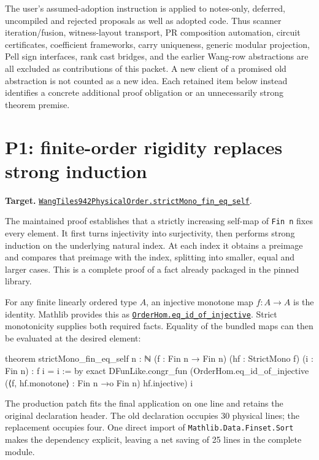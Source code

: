 \documentclass[11pt]{article}
\newcommand{\code}[1]{\nolinkurl{#1}}
\newcommand{\repo}[2]{\href{https://github.com/VladimirReshetnikov/ProveIt/blob/7df43cdfacb490cd3ca3acd23e39027efebf8801/Computability/DiophantineConsistency/#1}{#2}}
\newcommand{\ml}[2]{\href{https://github.com/leanprover-community/mathlib4/blob/81a5d257c8e410db227a6665ed08f64fea08e997/Mathlib/#1}{#2}}
\begin{document}
The user's assumed-adoption instruction is applied to notes-only, deferred, uncompiled and rejected proposals as well as adopted code. Thus scanner iteration/fusion, witness-layout transport, PR composition automation, circuit certificates, coefficient frameworks, carry uniqueness, generic modular projection, Pell sign interfaces, rank cast bridges, and the earlier Wang-row abstractions are all excluded as contributions of this packet. A new client of a promised old abstraction is not counted as a new idea. Each retained item below instead identifies a concrete additional proof obligation or an unnecessarily strong theorem premise.

\section{P1: finite-order rigidity replaces strong induction}
\label{sec:order}

\textbf{Target.} \repo{Lean/DiophantineConsistency/WangTiles942PhysicalOrder.lean}{\code{WangTiles942PhysicalOrder.strictMono_fin_eq_self}}.

The maintained proof establishes that a strictly increasing self-map of \code{Fin n} fixes every element. It first turns injectivity into surjectivity, then performs strong induction on the underlying natural index. At each index it obtains a preimage and compares that preimage with the index, splitting into smaller, equal and larger cases. This is a complete proof of a fact already packaged in the pinned library.

For any finite linearly ordered type $A$, an injective monotone map $f:A\to A$ is the identity. Mathlib provides this as \ml{Data/Finset/Sort.lean}{\code{OrderHom.eq_id_of_injective}}. Strict monotonicity supplies both required facts. Equality of the bundled maps can then be evaluated at the desired element:

\begin{Lean}
theorem strictMono_fin_eq_self {n : ℕ} (f : Fin n → Fin n)
    (hf : StrictMono f) (i : Fin n) : f i = i := by
  exact DFunLike.congr_fun
    (OrderHom.eq_id_of_injective
      (⟨f, hf.monotone⟩ : Fin n →o Fin n) hf.injective) i
\end{Lean}

The production patch fits the final application on one line and retains the original declaration header. The old declaration occupies 30 physical lines; the replacement occupies four. One direct import of \code{Mathlib.Data.Finset.Sort} makes the dependency explicit, leaving a net saving of 25 lines in the complete module.
\end{document}
